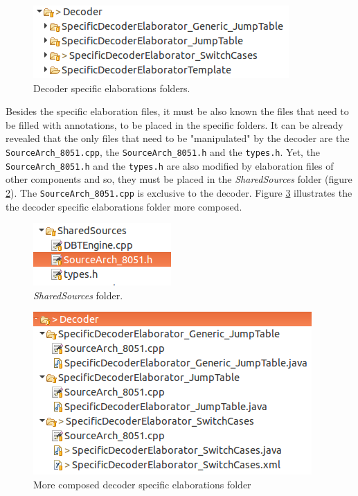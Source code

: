\documentclass[12pt]{article}
\begin{document}
{\begin{figure}[H]
\centerline{
\includegraphics[scale=0.5]{images/spec1}
}
\caption{Decoder specific elaborations folders.}
\label{fig:decoder_spec2}
\end{figure}

Besides the specific elaboration files, it must be also known the files that need to be filled with annotations, to be placed in the specific folders. It can be already revealed that the only files that need to be "manipulated" by the decoder are the \texttt{SourceArch\_8051.cpp}, the \texttt{SourceArch\_8051.h} and the \texttt{types.h}. Yet, the \texttt{SourceArch\_8051.h} and the  \texttt{types.h} are also modified by elaboration files of other components and so, they must be placed in the \textit{SharedSources} folder (figure \ref{fig:decoder_spec3}). The \texttt{SourceArch\_8051.cpp} is exclusive to the decoder. Figure \ref{fig:decoder_spec4} illustrates the the decoder specific elaborations folder more composed.

\begin{figure}[H]
\centerline{
\includegraphics[scale=0.6]{images/spec2}
}
\caption{\textit{SharedSources} folder.}
\label{fig:decoder_spec3}
\end{figure}


\begin{figure}[H]
\centerline{
\includegraphics[scale=0.5]{images/spec3}
}
\caption{More composed decoder specific elaborations folder}
\label{fig:decoder_spec4}
\end{figure}

}
\end{document}
